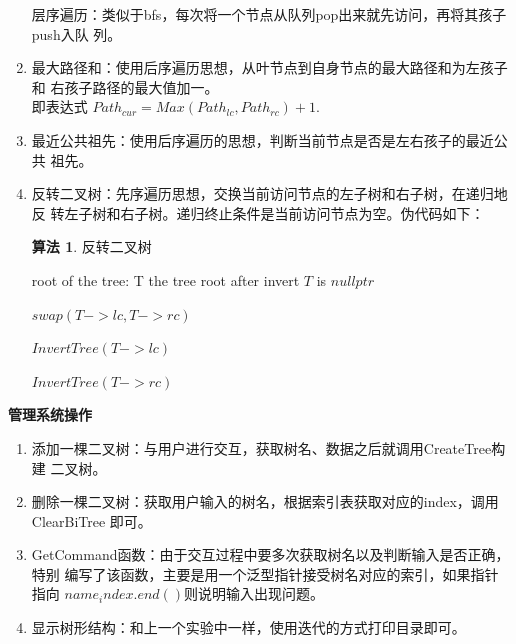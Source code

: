 \documentclass[supercite]{Experimental_Report}
\theoremstyle{definition}
\newtheorem{alg}{算法}[section]
\begin{document}
\begin{enumerate}
		层序遍历：类似于bfs，每次将一个节点从队列pop出来就先访问，再将其孩子push入队
		列。
		\item 最大路径和：使用后序遍历思想，从叶节点到自身节点的最大路径和为左孩子和
		右孩子路径的最大值加一。\\即表达式
		$Path_{cur} = Max(Path_{lc}, Path_{rc}) + 1$.
		\item 最近公共祖先：使用后序遍历的思想，判断当前节点是否是左右孩子的最近公共
		祖先。
		\item 反转二叉树：先序遍历思想，交换当前访问节点的左子树和右子树，在递归地反
		转左子树和右子树。递归终止条件是当前访问节点为空。伪代码如下：
		\begin{shaded*}\begin{alg}{反转二叉树}
				\begin{algorithmic}
					\Input root of the tree: T
					\Output the tree root after invert
					\If $T$ is $nullptr$
					\State \Return 
					\EndIf\par
					$swap(T->lc, T->rc)$\par
					$InvertTree(T->lc)$\par
					$InvertTree(T->rc)$
					\EndProcedure
				\end{algorithmic}
		\end{alg}\end{shaded*}
		
	\end{enumerate}
	\noindent \textbf{管理系统操作}
	\begin{enumerate}
		\item 添加一棵二叉树：与用户进行交互，获取树名、数据之后就调用CreateTree构建
		二叉树。
		\item 
		删除一棵二叉树：获取用户输入的树名，根据索引表获取对应的index，调用ClearBiTree
		即可。
		\item GetCommand函数：由于交互过程中要多次获取树名以及判断输入是否正确，特别
		编写了该函数，主要是用一个泛型指针接受树名对应的索引，如果指针指向
		$name_index.end()$则说明输入出现问题。
		\item 显示树形结构：和上一个实验中一样，使用迭代的方式打印目录即可。
	\end{enumerate}
\end{document}
